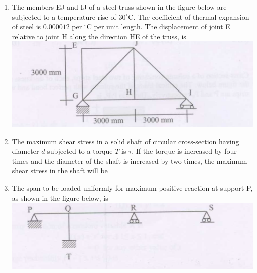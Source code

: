 \documentclass[journal]{IEEEtran}
\begin{document}
\begin{enumerate}
\item The members EJ and IJ of a steel truss shown in the figure below are subjected to a temperature rise of $30^\circ\text{C}$. The coefficient of thermal expansion of steel is $0.000012$ per $^\circ\text{C}$ per unit length. The displacement  of joint E relative to joint H along the direction HE of the truss, is \hfill {}
\includegraphics[width=0.6\columnwidth]{figs/fig7.png} 
\begin{enumerate}
\end{enumerate}

\item The maximum shear stress in a solid shaft of circular cross-section having diameter $d$ subjected to a torque $T$ is $\tau$. If the torque is increased by four times and the diameter of the shaft is increased by two times, the maximum shear stress in the shaft will be  \hfill {}
\begin{enumerate}
\end{enumerate}

\item The span to be loaded uniformly for maximum positive  reaction at support P, as shown in the figure below, is \hfill {}
\includegraphics[width=0.6\columnwidth]{figs/fig8.png} 


\end{enumerate}
\end{document}
